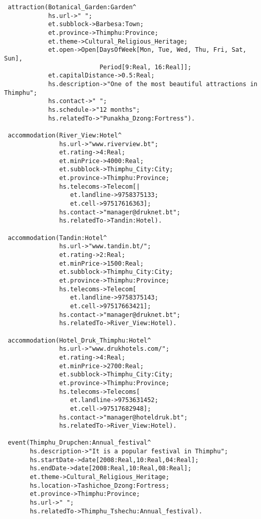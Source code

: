 \begin{verbatim}
 attraction(Botanical_Garden:Garden^
            hs.url->" ";
            et.subblock->Barbesa:Town;
            et.province->Thimphu:Province;
            et.theme->Cultural_Religious_Heritage;
            et.open->Open[DaysOfWeek[Mon, Tue, Wed, Thu, Fri, Sat, Sun],
                          Period[9:Real, 16:Real]];
            et.capitalDistance->0.5:Real;
            hs.description->"One of the most beautiful attractions in Thimphu";
            hs.contact->" ";
            hs.schedule->"12 months";
            hs.relatedTo->"Punakha_Dzong:Fortress").   

 accommodation(River_View:Hotel^
               hs.url->"www.riverview.bt";
               et.rating->4:Real;
               et.minPrice->4000:Real;
               et.subblock->Thimphu_City:City;
               et.province->Thimphu:Province;
               hs.telecoms->Telecom[|
                  et.landline->9758375133;
                  et.cell->97517616363];
               hs.contact->"manager@druknet.bt";
               hs.relatedTo->Tandin:Hotel).

 accommodation(Tandin:Hotel^
               hs.url->"www.tandin.bt/";
               et.rating->2:Real;
               et.minPrice->1500:Real;
               et.subblock->Thimphu_City:City;
               et.province->Thimphu:Province;
               hs.telecoms->Telecom[
                  et.landline->9758375143;
                  et.cell->97517663421];
               hs.contact->"manager@druknet.bt";
               hs.relatedTo->River_View:Hotel).   

 accommodation(Hotel_Druk_Thimphu:Hotel^
               hs.url->"www.drukhotels.com/";
               et.rating->4:Real;
               et.minPrice->2700:Real;
               et.subblock->Thimphu_City:City;
               et.province->Thimphu:Province;
               hs.telecoms->Telecoms[
                  et.landline->9753631452;
                  et.cell->97517682948];
               hs.contact->"manager@hoteldruk.bt";
               hs.relatedTo->River_View:Hotel).                      
                          
 event(Thimphu_Drupchen:Annual_festival^
       hs.description->"It is a popular festival in Thimphu";
       hs.startDate->date[2008:Real,10:Real,04:Real];
       hs.endDate->date[2008:Real,10:Real,08:Real];
       et.theme->Cultural_Religious_Heritage;
       hs.location->Tashichoe_Dzong:Fortress;
       et.province->Thimphu:Province;
       hs.url->" ";
       hs.relatedTo->Thimphu_Tshechu:Annual_festival).


\end{verbatim}
